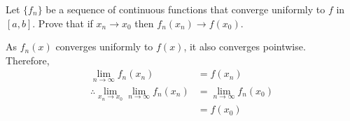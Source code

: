 \documentclass[fleqn, a4paper, 12pt, oneside]{amsart}
\theoremstyle{definition}
\theoremstyle{theorem}
\begin{document}
\begin{question}
	Let $\{f_n\}$ be a sequence of continuous functions that converge uniformly to $f$ in $[a,b]$.
	Prove that if $x_n \to x_0$ then $f_n(x_n) \to f(x_0)$.
\end{question}

\begin{solution}
	As $f_n(x)$ converges uniformly to $f(x)$, it also converges pointwise.\\
	Therefore,
	\begin{align*}
		\lim\limits_{n \to \infty} f_n(x_n) &= f(x_n)\\
		\therefore \lim\limits_{x_n \to x_0} \lim\limits_{n \to \infty} f_n(x_n) &= \lim\limits_{n \to \infty} f_n(x_0)\\
		&= f(x_0)
	\end{align*}
\end{solution}
\end{document}
